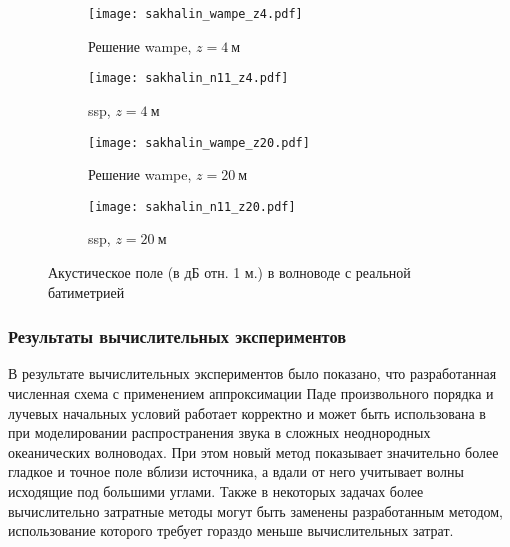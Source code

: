 \documentclass[../document.tex]{subfiles}
\begin{document}
                \begin{figure}[h]
                    \centering
                    \begin{subfigure}[t]{0.75\textwidth}
                        \centering
                        \texttt{[image: sakhalin\_wampe\_z4.pdf]}
                        \caption{Решение \acrshort{wampe}, $z=4\ \text{м}$}
                    \end{subfigure}
                    \hfill
                    \begin{subfigure}[t]{0.75\textwidth}
                        \centering
                        \texttt{[image: sakhalin\_n11\_z4.pdf]}
                        \caption{\acrshort{ssp}, $z=4\ \text{м}$}
                    \end{subfigure}
                    \hfill
                    \begin{subfigure}[t]{0.75\textwidth}
                        \centering
                        \texttt{[image: sakhalin\_wampe\_z20.pdf]}
                        \caption{Решение \acrshort{wampe}, $z=20\ \text{м}$}
                    \end{subfigure}
                    \hfill
                    \begin{subfigure}[t]{0.75\textwidth}
                        \centering
                        \texttt{[image: sakhalin\_n11\_z20.pdf]}
                        \caption{\acrshort{ssp}, $z=20\ \text{м}$}
                    \end{subfigure}
                    \caption{Акустическое поле (в дБ отн. 1 м.) в волноводе с реальной батиметрией\label{fig::sakhalin_field}}
                \end{figure}
                \FloatBarrier
            \subsubsection{Результаты вычислительных экспериментов}
                \par В результате вычислительных экспериментов было показано, что разработанная численная схема с применением аппроксимации Паде произвольного порядка и лучевых начальных условий работает корректно и может быть использована в при моделировании распространения звука в сложных неоднородных океанических волноводах. При этом новый метод показывает значительно более гладкое и точное поле вблизи источника, а вдали от него учитывает волны исходящие под большими углами. Также в некоторых задачах более вычислительно затратные методы могут быть заменены разработанным методом, использование которого требует гораздо меньше вычислительных затрат.
\end{document}
